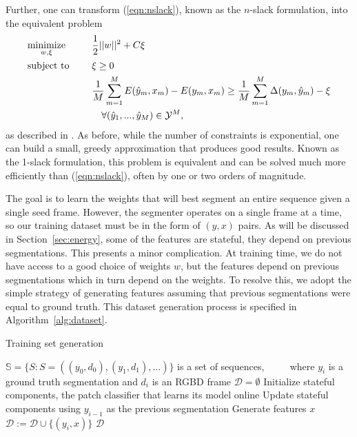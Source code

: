 \documentclass[graybox]{svmult}
\begin{document}
Further, one can transform (\ref{eqn:nslack}), known as the $n$-slack formulation, into the equivalent problem
\begin{equation}
  \begin{aligned}
    & \underset{w, \xi}{\mbox{minimize}}\quad & & \frac{1}{2} ||w||^2 + C\xi \\
    & \mbox{subject to }\quad & & \xi \geq 0 \\
    & & & \frac{1}{M} \sum_{m=1}^M E ( \hat{y}_m, x_m )
    - E ( y_m, x_m ) \geq \frac{1}{M} \sum_{m=1}^M \Delta(y_m, \hat{y}_m) - \xi \\
    & & & \quad \forall (\hat{y}_1, ..., \hat{y}_M) \in \mathcal{Y}^M,
  \end{aligned}
\end{equation}
as described in \cite{joachims2009a}.  As before, while the number of constraints is exponential, one can build a small, greedy approximation that produces good results.  Known as the 1-slack formulation, this problem is equivalent and can be solved much more efficiently than (\ref{eqn:nslack}), often by one or two orders of magnitude.

The goal is to learn the weights that will best segment an entire sequence given a single seed frame.  However, the segmenter operates on a single frame at a time, so our training dataset must be in the form of $(y, x)$ pairs. As will be discussed in Section~\ref{sec:energy}, some of the features are stateful, \ie they depend on previous segmentations.  This presents a minor complication.  At training time, we do not have access to a good choice of weights $w$, but the features depend on previous segmentations which in turn depend on the weights.  To resolve this, we adopt the simple strategy of generating features assuming that previous segmentations were equal to ground truth.  This dataset generation process is specified in Algorithm~\ref{alg:dataset}.

\begin{algorithm}
  \caption{Training set generation}
  \label{alg:dataset}
  \begin{algorithmic}
    \STATE $\mathbb{S} = \{S : S = ((y_0, d_0), (y_1, d_1),                       \dots)\}$ is a set of sequences,
\STATE $\qquad$ where $y_i$ is a ground truth segmentation and $d_i$ is an RGBD frame
\STATE $\mathcal{D} = \emptyset$
\STATE Initialize stateful components, \eg the patch classifier that learns its model online
\STATE Update stateful components using $y_{i-1}$ as the previous segmentation
\STATE Generate features $x$
\STATE $\mathcal{D} := \mathcal{D} \cup \{(y_i, x)\}$
\ENDFOR
\ENDFOR
\RETURN $\mathcal{D}$
  \end{algorithmic}
\end{algorithm}
\end{document}

